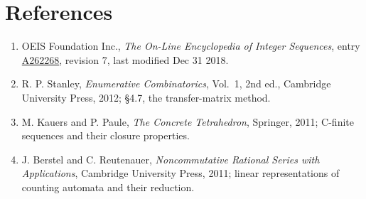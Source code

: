 \documentclass[11pt]{article}
\theoremstyle{definition}
\begin{document}
\section{References}

\begin{enumerate}

\item OEIS Foundation Inc., \emph{The On-Line Encyclopedia of Integer Sequences}, entry \href{https://oeis.org/A262268}{A262268}, revision 7, last modified Dec 31 2018.

\item R. P. Stanley, \emph{Enumerative Combinatorics}, Vol.~1, 2nd ed., Cambridge University Press, 2012; \S4.7, the transfer-matrix method.

\item M. Kauers and P. Paule, \emph{The Concrete Tetrahedron}, Springer, 2011; C-finite sequences and their closure properties.

\item J. Berstel and C. Reutenauer, \emph{Noncommutative Rational Series with Applications}, Cambridge University Press, 2011; linear representations of counting automata and their reduction.

\end{enumerate}
\end{document}
